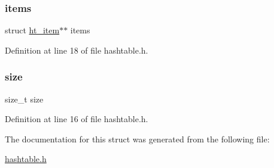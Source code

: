 \subsubsection{\texorpdfstring{items}{items}}
{\footnotesize\ttfamily struct \mbox{\hyperlink{structht__item}{ht\+\_\+item}}$\ast$$\ast$ items}



Definition at line 18 of file hashtable.\+h.

\mbox{\label{structhashtable_a854352f53b148adc24983a58a1866d66}} 
\subsubsection{\texorpdfstring{size}{size}}
{\footnotesize\ttfamily size\+\_\+t size}



Definition at line 16 of file hashtable.\+h.



The documentation for this struct was generated from the following file\+:\begin{DoxyCompactItemize}
\item 
\mbox{\hyperlink{hashtable_8h}{hashtable.\+h}}\end{DoxyCompactItemize}
